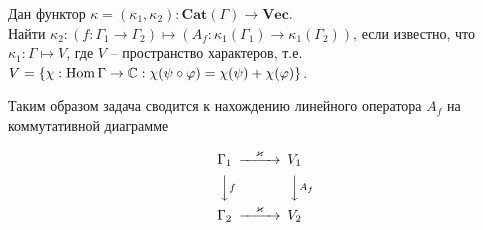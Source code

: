 \begin{problem}
    Дан функтор $\kappa = (\kappa_1, \kappa_2): \mathbf{Cat}(\Gamma) \to 
    \mathbf{Vec}$. \\ 
    Найти $\kappa_2 : (f: \Gamma_1 \to \Gamma_2) \mapsto 
    (A_f: \kappa_1(\Gamma_1) \to \kappa_1(\Gamma_2))$, если известно, что 
    $\kappa_1 : \Gamma \mapsto V$, где $V$ -- пространство характеров, т.е. 
    $V = \{\chi: \operatorname*{Hom} \Gamma \to \mathbb{C}: \chi(\psi \circ \varphi) = 
    \chi(\psi) + \chi(\varphi)\}$.
\end{problem}

Таким образом задача сводится к нахождению линейного оператора $A_f$ на 
коммутативной диаграмме

\[\begin{CD}
    \Gamma_1 @>\kappa>> V_1 \\
    @VVfV          @VVA_fV\\
    \Gamma_2 @>\kappa>> V_2
\end{CD}\]

